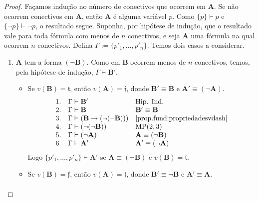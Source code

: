\begin{proof}
    Façamos indução no número de conectivos que ocorrem em $\mathbf{A}$. Se não ocorrem conectivos em $\mathbf{A}$, então $\mathbf{A}$ é alguma variável $p$. Como $\{p \} \vdash p$ e $\{ \neg p\} \vdash \neg p$, o resultado segue. Suponha, por hipótese de indução, que o resultado vale para toda fórmula com menos de $n$ conectivos, e seja $\mathbf{A}$ uma fórmula na qual ocorrem $n$ conectivos. Defina $\Gamma := \{p'_1, \ldots, p'_n \}$. Temos dois casos a considerar.
        \begin{enumerate}[label=\roman*.]
            \item $\mathbf{A}$ tem a forma $(\neg \mathbf{B})$. Como em $\mathbf{B}$ ocorrem menos de $n$ conectivos, temos, pela hipótese de indução, $\Gamma \vdash \mathbf{B}'$.
                \begin{itemize}
                    \item Se $v(\mathbf{B}) = \mathfrak{t}$, então $v(\mathbf{A}) = \mathfrak{f}$, donde $\mathbf{B}' \equiv \mathbf{B}$ e $\mathbf{A}' \equiv (\neg \mathbf{A})$.
                        \[
                            \begin{array}{rll}
                                1. & \Gamma \vdash \mathbf{B}' & \text{Hip. Ind.} \\
                                2. & \Gamma \vdash \mathbf{B} & \mathbf{B}' \equiv \mathbf{B} \\
                                3. & \Gamma \vdash (\mathbf{B} \rightarrow (\neg (\neg \mathbf{B})) ) & \eqref{prop.fund:propriedadesvdash} \\
                                4. & \Gamma \vdash (\neg (\neg \mathbf{B})) & \text{MP}(2,3) \\
                                5. & \Gamma \vdash (\neg \mathbf{A}) & \mathbf{A} \equiv (\neg \mathbf{B}) \\
                                6. & \Gamma \vdash \mathbf{A}' & \mathbf{A}' \equiv (\neg \mathbf{A})
                            \end{array}
                        \]
                    Logo $\{p'_1, \ldots, p'_n \} \vdash \mathbf{A}'$ se $\mathbf{A} \equiv (\neg \mathbf{B})$ e $v(\mathbf{B}) = \mathfrak{t}$.
                    \item Se $v(\mathbf{B}) = \mathfrak{f}$, então $v(\mathbf{A}) = \mathfrak{t}$, donde $\mathbf{B}' \equiv \neg \mathbf{B}$ e $\mathbf{A}' \equiv \mathbf{A}$.
                        \[
                            \begin{array}{rll}

\end{array}\]
\end{itemize}
\end{enumerate}
\end{proof}
